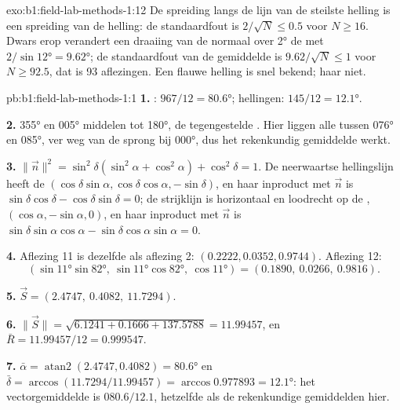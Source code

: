 \begin{solution}{exo:b1:field-lab-methods-1:12}
De spreiding langs de lijn van de steilste helling is een spreiding van de helling: de standaardfout is
$2/\sqrt N \le 0.5$ voor $N \ge 16$. Dwars erop verandert een draaiing van de normaal over \ang{2} de  met
$2/\sin\ang{12} = \ang{9.62}$; de standaardfout van de gemiddelde  is $9.62/\sqrt N \le 1$ voor
$N \ge 92.5$, dat is 93 aflezingen. Een flauwe helling is snel bekend; haar  niet.
\end{solution}

\begin{solution}{pb:b1:field-lab-methods-1:1}
\textbf{1.} : $967/12 = \ang{80.6}$; hellingen: $145/12 =
\ang{12.1}$.

\textbf{2.} \ang{355} en \ang{005} middelen tot \ang{180}, de tegengestelde
. Hier liggen alle  tussen \ang{076} en \ang{085}, ver weg van de sprong bij
\ang{000}, dus het rekenkundig gemiddelde werkt.

\textbf{3.} $\|\vec n\|^2 = \sin^2\delta(\sin^2\alpha + \cos^2\alpha) +
\cos^2\delta = 1$. De neerwaartse hellingslijn heeft de 
$(\cos\delta\sin\alpha, \cos\delta\cos\alpha, -\sin\delta)$, en haar inproduct met $\vec n$ is
$\sin\delta\cos\delta - \cos\delta\sin\delta = 0$; de strijklijn is horizontaal en loodrecht op de
, $(\cos\alpha, -\sin\alpha, 0)$, en haar inproduct met $\vec n$ is
$\sin\delta\sin\alpha\cos\alpha - \sin\delta\cos\alpha\sin\alpha = 0$.

\textbf{4.} Aflezing 11 is dezelfde als aflezing 2: $(0.2222, 0.0352, 0.9744)$.
Aflezing 12:
\[
  (\sin\ang{11}\sin\ang{82},\ \sin\ang{11}\cos\ang{82},\ \cos\ang{11}) =
  (0.1890,\ 0.0266,\ 0.9816).
\]

\textbf{5.} $\vec S = (2.4747,\ 0.4082,\ 11.7294)$.

\textbf{6.} $\|\vec S\| = \sqrt{6.1241 + 0.1666 + 137.5788} = 11.99457$, en
$\bar R = 11.99457/12 = 0.999547$.

\textbf{7.} $\bar\alpha = \operatorname{atan2}(2.4747, 0.4082) = \ang{80.6}$
en $\bar\delta = \arccos(11.7294/11.99457) = \arccos 0.977893 = \ang{12.1}$:
het vectorgemiddelde is $080.6/12.1$, hetzelfde als de rekenkundige gemiddelden hier.


\end{solution}
